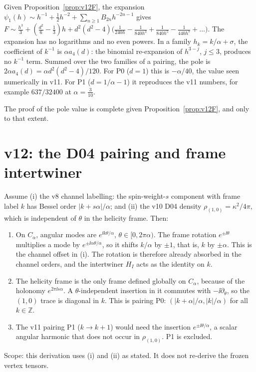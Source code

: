 \begin{corollary}
\label{cor:v12pole}
Given Proposition~\ref{prop:v12F}, the expansion
\(\psi_1(h)\sim h^{-1}+\tfrac12h^{-2}+\sum_{n\ge1}B_{2n}h^{-2n-1}\)
gives \(F\sim\tfrac{h^3}3+(\tfrac{d^2}6-\tfrac13)h+d^2(d^2-4)
\bigl(\tfrac1{240h}-\tfrac1{840h^3}+\tfrac1{840h^5}-\tfrac1{440h^7}+\dots\bigr)\).
The expansion has no logarithms and no even powers. In a family
\(h_k=k/\alpha+\sigma\), the coefficient of \(k^{-1}\) is
\(\alpha a_4(d)\): the binomial re-expansion of \(h^{3-j}\), \(j\le3\),
produces no \(k^{-1}\) term. Summed over the two families of a
pairing, the pole is \(2\alpha a_4(d)=\alpha d^2(d^2-4)/120\). For
P0 (\(d=1\)) this is \(-\alpha/40\), the value seen numerically in
v11. For P1 (\(d=1/\alpha-1\)) it reproduces the v11 numbers, for
example \(637/32400\) at \(\alpha=\tfrac3{10}\).
\end{corollary}
The proof of the pole value is complete given
Proposition~\ref{prop:v12F}, and only to that extent.

\section{v12: the D04 pairing and frame intertwiner}
\label{sec:v12pair}

\begin{proposition}[Pairing]
\label{prop:v12pair}
Assume (i) the v8 channel labelling: the spin-weight-\(s\) component
with frame label \(k\) has Bessel order \(|k+s\alpha|/\alpha\); and
(ii) the v10 D04 density \(\rho_{(1,0)}=\kappa^2/4\pi\), which is
independent of \(\theta\) in the helicity frame. Then:
\begin{enumerate}[label=(\alph*)]
\item On \(C_\alpha\), angular modes are \(e^{\ii k\theta/\alpha}\),
\(\theta\in[0,2\pi\alpha)\). The frame rotation \(e^{\pm\ii\theta}\)
multiplies a mode by \(e^{\pm\ii\alpha\theta/\alpha}\), so it shifts
\(k/\alpha\) by \(\pm1\), that is, \(k\) by \(\pm\alpha\). This is
the channel offset in (i). The rotation is therefore already
absorbed in the channel orders, and the intertwiner \(H_I\) acts as
the identity on \(k\).
\item The helicity frame is the only frame defined globally on
\(C_\alpha\), because of the holonomy \(e^{2\pi\ii s\alpha}\). A
\(\theta\)-independent insertion in it commutes with
\(-\ii\partial_\theta\), so the \((1,0)\) trace is diagonal in \(k\).
This is pairing P0:
\((|k+\alpha|/\alpha,|k|/\alpha)\) for all \(k\in\mathbb Z\).
\item The v11 pairing P1 (\(k\to k+1\)) would need the insertion
\(e^{\pm\ii\theta/\alpha}\), a scalar angular harmonic that does
not occur in \(\rho_{(1,0)}\). P1 is excluded.
\end{enumerate}
\end{proposition}
Scope: this derivation uses (i) and (ii) as stated. It does not
re-derive the frozen vertex tensors.


